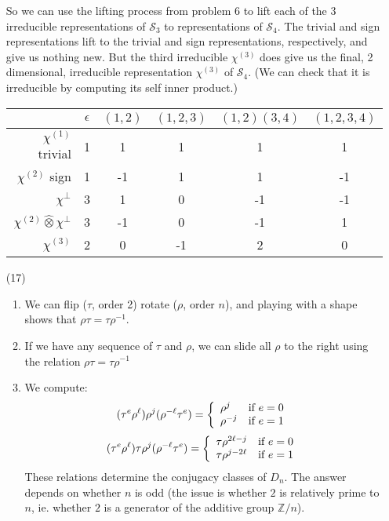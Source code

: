 \documentclass{amsart}
\newcommand{\ZZ}{\mathbb{Z}}
\renewcommand{\S}{\mathcal{S}}
\begin{document}
\begin{enumerate}
     So we can use the lifting process from problem 6 to lift each of the 3 irreducible representations of $\S_3$ to representations of $\S_4$.
     The trivial and sign representations lift to the trivial and sign representations, respectively, and give us nothing new.  But the third irreducible $\chi^{(3)}$ does give us the final, 2 dimensional, irreducible representation $\chi^{(3)}$ of $\S_4$.  (We can check that it is irreducible by computing its self inner product.)
    \begin{center}
        \begin{tabular}{r|ccccc}
                    & $\epsilon$ & $(1,2)$ & $(1,2,3)$ & $(1,2)(3,4)$ & $(1,2,3,4)$ \\
\hline
$\chi^{(1)}$ trivial  &     1    &     1   &      1    &      1       &     1    \\
 $\chi^{(2)}$ sign  &     1      &    -1   &    1      &      1       &     -1 \\
    $\chi^{\perp}$  &     3      &   1     &    0      &     -1       &    -1   \\
    $\chi^{(2)} \hat{\otimes} \chi^{\perp}$ &  3  & -1 & 0 & -1 & 1 \\
    $\chi^{(3)}$    & 2  & 0 & -1 & 2 & 0 \\
        \end{tabular}
    \end{center}
    \item[(17)]  
    \begin{enumerate}
        \item We can flip ($\tau$, order 2) rotate ($\rho$, order $n$), and playing with a shape shows that $\rho \tau = \tau \rho^{-1}$.
        \item If we have any sequence of $\tau$ and $\rho$, we can slide all $\rho$ to the right using the relation $\rho \tau = \tau \rho^{-1}$
        \item We compute:
        \[
        (\tau^e \rho^\ell)\rho^j(\rho^{-\ell}\tau^e) =
        \left\{ \begin{array}{ll} \rho^j & \textnormal{if $e=0$} \\
                                  \rho^{-j} & \textnormal{if $e=1$}
                                \end{array}\right.
        \]
        \[
        (\tau^e \rho^\ell)\tau\rho^j(\rho^{-\ell}\tau^e) =
        \left\{ \begin{array}{ll} \tau\rho^{2\ell-j} & \textnormal{if $e=0$} \\
                                  \tau\rho^{j-2\ell} & \textnormal{if $e=1$}
                                \end{array}\right.
        \]
        These relations determine the conjugacy classes of $D_n$.  The answer depends on whether $n$ is odd (the issue is whether $2$ is relatively prime to $n$, ie. whether $2$ is a generator of the additive group $\ZZ/n$).


\end{enumerate}
\end{enumerate}
\end{document}

